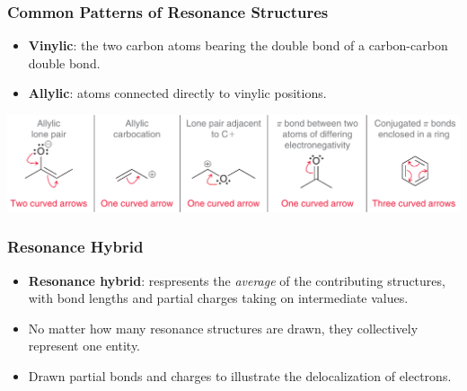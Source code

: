 \documentclass[12pt,a4paper]{article}
\begin{document}
\begin{itemize}
    \subsubsection{Common Patterns of Resonance Structures}
    \begin{itemize}
        \item \textbf{Vinylic}: the two carbon atoms bearing the double bond of a carbon-carbon double bond.
        \item \textbf{Allylic}: atoms connected directly to vinylic positions.
    \end{itemize}
    \includegraphics[width=\linewidth]{images/patterns.png}
    \subsubsection{Resonance Hybrid}
    \begin{itemize}
        \item \textbf{Resonance hybrid}: respresents the \textit{average} of the contributing structures, with bond lengths and partial charges taking on intermediate values.
        \item No matter how many resonance structures are drawn, they collectively represent one entity.
        \item Drawn partial bonds and charges to illustrate the delocalization of electrons.
    \end{itemize}

\end{itemize}
\end{document}
